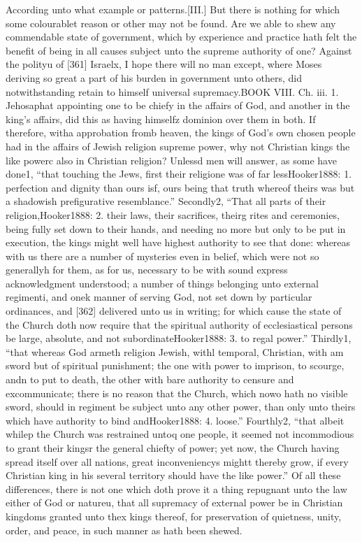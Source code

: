 According unto what example or patterns.[III.] But there is nothing for which some colourablet reason or other may not be found. Are we able to shew any commendable state of government, which by experience and practice hath felt the benefit of being in all causes subject unto the supreme authority of one? Against the polityu of [361] Israelx, I hope there will no man except, where Moses deriving so great a part of his burden in government unto others, did notwithstanding retain to himself universal supremacy.BOOK VIII. Ch. iii. 1. Jehosaphat appointing one to be chiefy in the affairs of God, and another in the king’s affairs, did this as having himselfz dominion over them in both. If therefore, witha approbation fromb heaven, the kings of God’s own chosen people had in the affairs of Jewish religion supreme power, why not Christian kings the like powerc also in Christian religion? Unlessd men will answer, as some have done1, “that touching the Jews, first their religione was of far lessHooker1888: 1. perfection and dignity than ours isf, ours being that truth whereof theirs was but a shadowish prefigurative resemblance.” Secondly2, “That all parts of their religion,Hooker1888: 2. their laws, their sacrifices, theirg rites and ceremonies, being fully set down to their hands, and needing no more but only to be put in execution, the kings might well have highest authority to see that done: whereas with us there are a number of mysteries even in belief, which were not so generallyh for them, as for us, necessary to be with sound express acknowledgment understood; a number of things belonging unto external regimenti, and onek manner of serving God, not set down by particular ordinances, and [362] delivered unto us in writing; for which cause the state of the Church doth now require that the spiritual authority of ecclesiastical persons be large, absolute, and not subordinateHooker1888: 3. to regal power.” Thirdly1, “that whereas God armeth religion Jewish, withl temporal, Christian, with am sword but of spiritual punishment; the one with power to imprison, to scourge, andn to put to death, the other with bare authority to censure and excommunicate; there is no reason that the Church, which nowo hath no visible sword, should in regiment be subject unto any other power, than only unto theirs which have authority to bind andHooker1888: 4. loose.” Fourthly2, “that albeit whilep the Church was restrained untoq one people, it seemed not incommodious to grant their kingsr the general chiefty of power; yet now, the Church having spread itself over all nations, great inconveniencys mightt thereby grow, if every Christian king in his several territory should have the like power.” Of all these differences, there is not one which doth prove it a thing repugnant unto the law either of God or natureu, that all supremacy of external power be in Christian kingdoms granted unto thex kings thereof, for preservation of quietness, unity, order, and peace, in such manner as hath been shewed.


